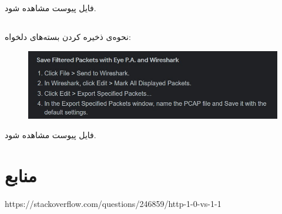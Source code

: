 \documentclass{article}
\begin{document}
\subsection{}
فایل پیوست مشاهده شود.
\subsection{}
نحوه‌ی ذخیره کردن بسته‌های دلخواه:
\begin{figure}[H]
    \centering
    \includegraphics[width=1.0\textwidth]{figures/59.jpg}
    \caption{}
    \label{fig:fig1}
\end{figure}
فایل پیوست مشاهده ‌شود.

\section*{منابع}
\renewcommand{\section}[2]{}%
\begin{thebibliography}{99} %


\begin{LTRitems}

\resetlatinfont

 https://stackoverflow.com/questions/246859/http-1-0-vs-1-1
\end{LTRitems}

\end{thebibliography}
\end{document}
